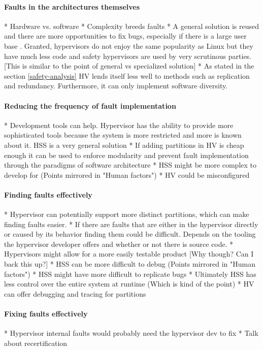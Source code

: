 \paragraph{Faults in the architectures themselves}

* Hardware vs. software
* Complexity breeds faults
* A general solution is reused and there are more opportunities to fix bugs, especially if there is a large user base \cite{palix2011faults}. Granted, hypervisors do not enjoy the same popularity as Linux but they have much less code and safety hypervisors are used by very scrutinous  parties. [This is similar to the point of general vs specialized solution]
* As stated in the section \ref{safety-analysis} HV lends itself less well to methods such as replication and redundancy. Furthermore, it can only implement software diversity.

\paragraph{Reducing the frequency of fault implementation}
* Development tools can help. Hypervisor has the ability to provide more sophisticated tools because the system is more restricted and more is known about it. HSS is a very general solution
* If adding partitions in HV is cheap enough it can be used to enforce modularity and prevent fault implementation through the paradigms of software architecture
* HSS might be more complex to develop for (Points mirrored in "Human factors")
* HV could be misconfigured
\paragraph{Finding  faults effectively}
* Hypervisor can potentially support more distinct partitions, which can make finding faults easier. 
* If there are faults that are either in the hypervisor directly or caused by its behavior finding them could be difficult. Depends on the tooling the hypervisor developer offers and whether or not there is source code.
* Hypervisors might allow for a more easily testable product [Why though? Can I back this up?]
* HSS can be more difficult to debug (Points mirrored in "Human factors")
* HSS might have more difficult to replicate bugs
* Ultimately HSS has less control over the entire system at runtime (Which is kind of the point)
* HV can offer debugging and tracing for partitions 
\paragraph{Fixing faults effectively}
* Hypervisor internal faults would probably need the hypervisor dev to fix
* Talk about recertification
